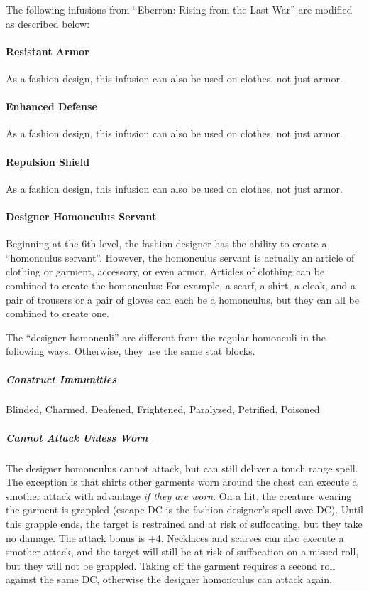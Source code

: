 \documentclass[twocolumn]{dndbook}
\begin{document}
The following infusions from ``Eberron: Rising from the Last War'' are modified as described below:
\paragraph{Resistant Armor}
As a fashion design, this infusion can also be used on clothes, not just armor.

\paragraph{Enhanced Defense}
As a fashion design, this infusion can also be used on clothes, not just armor.

\paragraph{Repulsion Shield}
As a fashion design, this infusion can also be used on clothes, not just armor.


\paragraph{Designer Homonculus Servant}
Beginning at the 6th level, the fashion designer has the ability to create a ``homonculus servant''.
However, the homonculus servant is actually an article of clothing or garment, accessory, or even armor.
Articles of clothing can be combined to create the homonculus:
For example, a scarf, a shirt, a cloak, and a pair of trousers or a pair of gloves can each be a homonculus,
but they can all be combined to create one.

The ``designer homonculi'' are different from the regular homonculi in the following ways.
Otherwise, they use the same stat blocks.

\subparagraph{Construct Immunities} Blinded, Charmed, Deafened, Frightened, Paralyzed, Petrified, Poisoned

\subparagraph{Cannot Attack Unless Worn}
The designer homonculus cannot attack, but can still deliver a touch range spell.
The exception is that shirts other garments worn around the chest can execute a smother attack with advantage \emph{if they are worn}.
On a hit, the creature wearing the garment is grappled (escape DC is the fashion designer's spell save DC).
Until this grapple ends, the target is restrained and at risk of suffocating, but they take no damage.
The attack bonus is +4.
Necklaces and scarves can also execute a smother attack, and the target will still be at risk of suffocation on a missed roll, but they will not be grappled.
Taking off the garment requires a second roll against the same DC, otherwise the designer homonculus can attack again.
\end{document}
